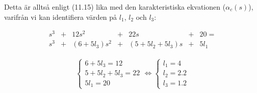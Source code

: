 \documentclass[a4paper]{article}
\begin{document}
Detta är alltså enligt (11.15) lika med den karakteristiska ekvationen ($\alpha_c(s)$), varifrån vi kan identifiera värden på $l_1$, $l_2$ och $l_3$:

\begin{align*}
  s^3 &+ &12s^2       &+ &22s                &+ &20 =\\
  s^3 &+ &(6+5l_3)s^2 &+ &(5 + 5l_2 + 5l_3)s &+ &5l_1
\end{align*}

\begin{align*}
  \left\{ \begin{array}{ll}
  6 + 5l_3 = 12\\
  5 + 5l_2 + 5l_3 = 22 \\
  5l_1 = 20
  \end{array} \right. \Longleftrightarrow
  \left\{ \begin{array}{ll}
  l_1 = 4\\
  l_2 = 2.2\\
  l_3 = 1.2
  \end{array} \right.
\end{align*}







\newpage
\end{document}
